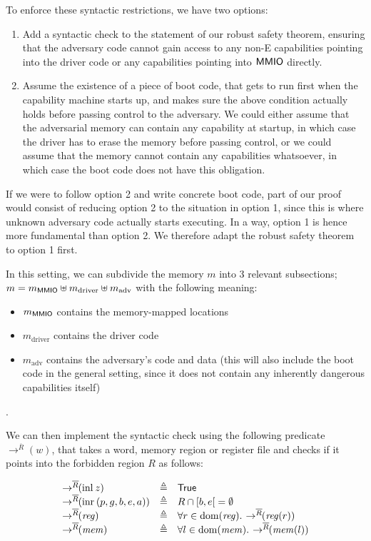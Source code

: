 \documentclass{article}
\newcommand{\X}[1]{\ensuremath{\mathrm{#1}}}
\newcommand{\V}[1]{\ensuremath{\mathit{#1}}}
\newcommand{\MMIO}{\textlog{MMIO}}
\begin{document}
To enforce these syntactic restrictions, we have two options:
\begin{enumerate}
\item Add a syntactic check to the statement of our robust safety theorem,
  ensuring that the adversary code cannot gain access to any non-E capabilities
  pointing into the driver code or any capabilities pointing into $\MMIO$ directly.
\item Assume the existence of a piece of boot code, that gets to run first when
  the capability machine starts up, and makes sure the above condition actually
  holds before passing control to the adversary. We could either assume that the
  adversarial memory can contain any capability at startup, in which case the
  driver has to erase the memory before passing control, or we could assume that
  the memory cannot contain any capabilities whatsoever, in which case the boot
  code does not have this obligation.
\end{enumerate}

If we were to follow option 2 and write concrete boot code, part of our proof
would consist of reducing option 2 to the situation in option 1, since this is
where unknown adversary code actually starts executing. In a way, option 1 is
hence more fundamental than option 2. We therefore adapt the robust safety
theorem to option 1 first.

In this setting, we can subdivide the memory $m$ into 3 relevant subsections;
$m = m_{\MMIO} \uplus m_{\X{driver}} \uplus m_{\X{adv}}$ %
with the following meaning:
\begin{itemize}
\item $m_{\MMIO}$ contains the memory-mapped locations
\item $m_{\X{driver}}$ contains the driver code
\item  $m_{\X{adv}}$ contains the adversary's code and data (this will also
  include the boot code in the general setting, since it does not contain any
  inherently dangerous capabilities itself)
\end{itemize}.

\newcommand{\notMapsToR}[2]{\rightarrow^{\overline{#1}}\!\!(#2)}

We can then implement the syntactic check using the following predicate
$\notMapsToR{R}{w}$, that takes a word, memory region or register file and checks if it points into the forbidden region $R$ as follows:

\[
  \begin{array}{lcl}
    \notMapsToR{R}{\X{inl}\spac z} & \eqdef
    & \TRUE \\
    \notMapsToR{R}{\X{inr}\spac (p,g,b,e,a)} & \eqdef & R \cap [b,e[\; =
                                                 \emptyset  \\
    \notMapsToR{R}{\V{reg}} & \eqdef & \forall r \in \dom(\V{reg}) \ldotp\spac \notMapsToR{R}{\V{reg}(r)} \\
    \notMapsToR{R}{\V{mem}} & \eqdef & \forall l \in \dom(\V{mem}) \ldotp\spac   \notMapsToR{R}{\V{mem}(l)}
  \end{array}
\]
\end{document}
